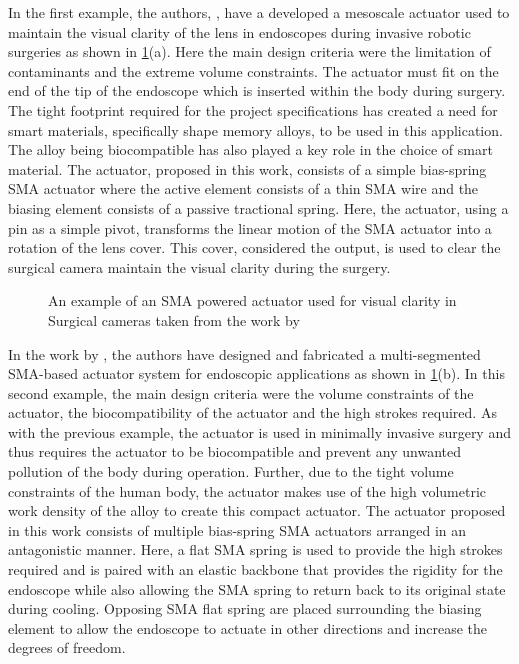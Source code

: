 In the first example, the authors, \todocite, have a developed a mesoscale actuator used to maintain the visual clarity of the lens in endoscopes during invasive robotic surgeries as shown in \cref{fig:biomed-examples}(a). Here the main design criteria were the limitation of contaminants and the extreme volume constraints. The actuator must fit on the end of the tip of the endoscope which is inserted within the body during surgery. The tight footprint required for the project specifications has created a need for smart materials, specifically shape memory alloys, to be used in this application. The alloy being biocompatible has also played a key role in the choice of smart material. The actuator, proposed in this work, consists of a simple bias-spring SMA actuator where the active element consists of a thin SMA wire and the biasing element consists of a passive tractional spring. Here, the actuator, using a pin as a simple pivot, transforms the linear motion of the SMA actuator into a rotation of the lens cover. This cover, considered the output, is used to clear the surgical camera maintain the visual clarity during the surgery.
\begin{figure}[hbt!]
    \centering
    
    \caption{An example of an SMA powered actuator used for visual clarity in Surgical cameras taken from the work by \todocite}
    \label{fig:biomed-examples}
\end{figure}

In the work by \todocite, the authors have designed and fabricated a multi-segmented SMA-based actuator system for endoscopic applications as shown in \cref{fig:biomed-examples}(b). In this second example, the main design criteria were the volume constraints of the actuator, the biocompatibility of the actuator and the high strokes required. As with the previous example, the actuator is used in minimally invasive surgery and thus requires the actuator to be biocompatible and prevent any unwanted pollution of the body during operation. Further, due to the tight volume constraints of the human body, the actuator makes use of the high volumetric work density of the alloy to create this compact actuator. The actuator proposed in this work consists of multiple bias-spring SMA actuators arranged in an antagonistic manner. Here, a flat SMA spring is used to provide the high strokes required and is paired with an elastic backbone that provides the rigidity for the endoscope while also allowing the SMA spring to return back to its original state during cooling. Opposing SMA flat spring are placed surrounding the biasing element to allow the endoscope to actuate in other directions and increase the degrees of freedom.

